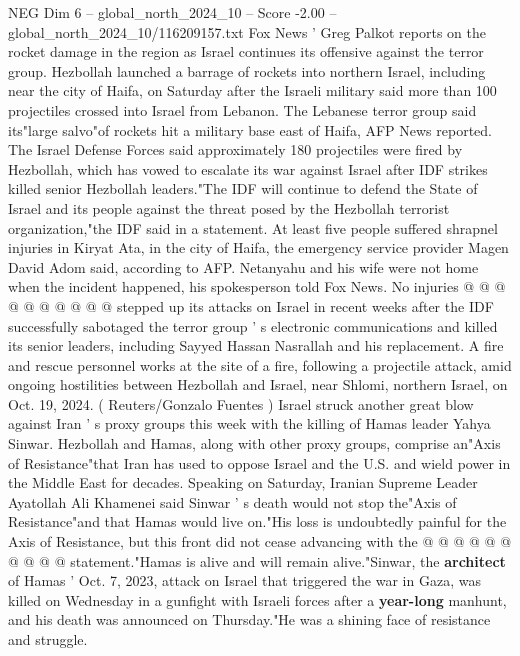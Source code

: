 \begin{textsample}{NEG Dim 6 – global\_north\_2024\_10 – Score -2.00 – global\_north\_2024\_10/116209157.txt}  \label{ex:f6_neg_049}
Fox News ' Greg Palkot reports on the rocket damage in the region as Israel continues its offensive against the terror group.
Hezbollah launched a barrage of rockets into northern Israel, including near the city of Haifa, on Saturday after the Israeli military said more than 100 projectiles crossed into Israel from Lebanon.
The Lebanese terror group said its"large salvo"of rockets hit a military base east of Haifa, AFP News reported.
The Israel Defense Forces said approximately 180 projectiles were fired by Hezbollah, which has vowed to escalate its war against Israel after IDF strikes killed senior Hezbollah leaders."The IDF will continue to defend the State of Israel and its people against the threat posed by the Hezbollah terrorist organization,"the IDF said in a statement.
At least five people suffered shrapnel injuries in Kiryat Ata, in the city of Haifa, the emergency service provider Magen David Adom said, according to AFP.
Netanyahu and his wife were not home when the incident happened, his spokesperson told Fox News.
No injuries @ @ @ @ @ @ @ @ @ @ stepped up its attacks on Israel in recent weeks after the IDF successfully sabotaged the terror group ' s electronic communications and killed its senior leaders, including Sayyed Hassan Nasrallah and his replacement.
A fire and rescue personnel works at the site of a fire, following a projectile attack, amid ongoing hostilities between Hezbollah and Israel, near Shlomi, northern Israel, on Oct. 19, 2024. ( Reuters/Gonzalo Fuentes ) Israel struck another great blow against Iran ' s proxy groups this week with the killing of Hamas leader Yahya Sinwar.
Hezbollah and Hamas, along with other proxy groups, comprise an"Axis of Resistance"that Iran has used to oppose Israel and the U.S. and wield power in the Middle East for decades.
Speaking on Saturday, Iranian Supreme Leader Ayatollah Ali Khamenei said Sinwar ' s death would not stop the"Axis of Resistance"and that Hamas would live on."His loss is undoubtedly painful for the Axis of Resistance, but this front did not cease advancing with the @ @ @ @ @ @ @ @ @ @ statement."Hamas is alive and will remain alive."Sinwar, the \textbf{architect} of Hamas ' Oct. 7, 2023, attack on Israel that triggered the war in Gaza, was killed on Wednesday in a gunfight with Israeli forces after a \textbf{year-long} manhunt, and his death was announced on Thursday."He was a shining face of resistance and struggle.

\end{textsample}
